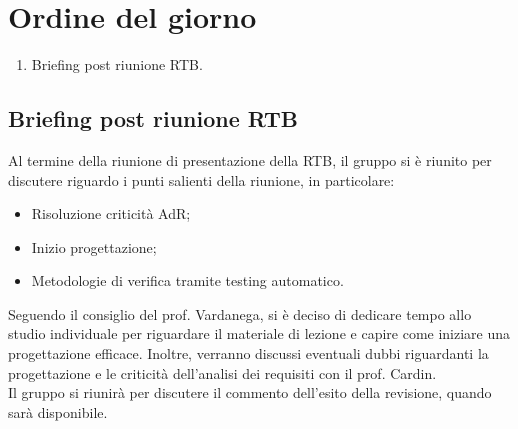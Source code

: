 \section{Ordine del giorno}
\begin{enumerate}
\item Briefing post riunione RTB.
\end{enumerate}

\subsection{Briefing post riunione RTB}
Al termine della riunione di presentazione della RTB, il gruppo si è riunito per discutere riguardo i punti salienti della riunione, in particolare:
\begin{itemize}
    \item Risoluzione criticità AdR;
    \item Inizio progettazione;
    \item Metodologie di verifica tramite testing automatico.
\end{itemize}
Seguendo il consiglio del prof. Vardanega, si è deciso di dedicare tempo allo studio individuale per riguardare il materiale di lezione e capire come iniziare una progettazione efficace.
Inoltre, verranno discussi eventuali dubbi riguardanti la progettazione e le criticità dell'analisi dei requisiti con il prof. Cardin.\\
Il gruppo si riunirà per discutere il commento dell'esito della revisione, quando sarà disponibile.